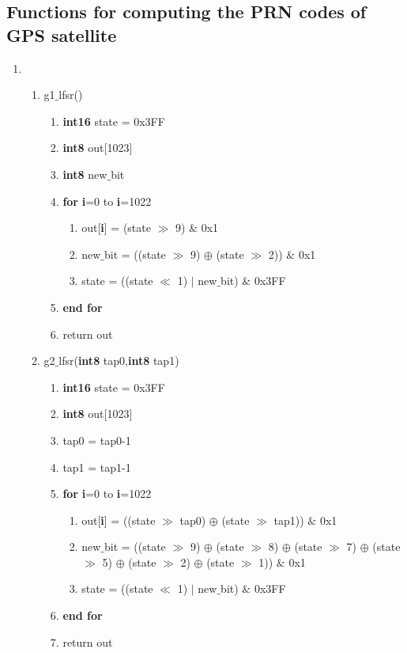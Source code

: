 \documentclass[journal,10pt,onecolumn]{article}
\begin{document}
\subsection{Functions for computing the PRN codes of GPS satellite}
\begin{enumerate}
    \item 
    \begin{enumerate}
    \item g1$\_$lfsr()
    \begin{enumerate}
    \item[] \textbf{int16} state = 0x3FF
    \item[] \textbf{int8} out[1023]
    \item[] \textbf{int8} new$\_$bit
    \item[] \textbf{for} \textbf{i}=0 to \textbf{i}=1022
        \begin{enumerate}
            \item[] out[\textbf{i}] = (state $\gg$ 9) \& 0x1 
            \item[] new$\_$bit = ((state $\gg$ 9) $\oplus$ (state $\gg$ 2)) $\&$ 0x1
            \item[] state = ((state $\ll$ 1) $\vert$  new$\_$bit) $\&$ 0x3FF
        \end{enumerate}
    \item[] \textbf{end for}
    \item[] return out
    \end{enumerate}
    
    

    \item g2$\_$lfsr(\textbf{int8} tap0,\textbf{int8} tap1)
    \begin{enumerate}
        \item[] \textbf{int16} state = 0x3FF
        \item[] \textbf{int8}  out[1023]
        \item[] tap0 = tap0-1
        \item[] tap1 = tap1-1 
        \item[] \textbf{for} \textbf{i}=0 to \textbf{i}=1022
        \begin{enumerate}
            \item[] out[\textbf{i}] = ((state $\gg$ tap0) $\oplus$ (state $\gg$ tap1)) $\&$ 0x1
            \item[] new$\_$bit =  ((state $\gg$ 9) $\oplus$ (state $\gg$ 8) $\oplus$
            (state $\gg$ 7) $\oplus$ (state $\gg$ 5) $\oplus$
            (state $\gg$ 2) $\oplus$ (state $\gg$ 1)) $\&$ 0x1
            \item[] state = ((state $\ll$ 1) $\vert$ new$\_$bit) $\&$ 0x3FF
        \end{enumerate}
        \item[] \textbf{end for}
        \item[] return out
    \end{enumerate}
    





\end{enumerate}
\end{enumerate}
\end{document}
